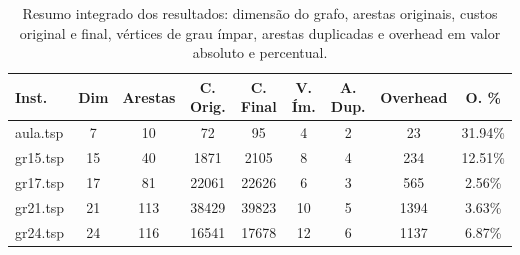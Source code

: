 \begin{table}[H]
    \centering
    \footnotesize
    \begin{tabular}{|l|c|c|c|c|c|c|c|c|}
        \hline
        \textbf{Inst.} & \textbf{Dim} & \textbf{Arestas} & \textbf{C. Orig.} & \textbf{C. Final} & \textbf{V. Ím.} & \textbf{A. Dup.} & \textbf{Overhead} & \textbf{O. \%} \\ \hline
        aula.tsp & 7 & 10 & 72 & 95 & 4 & 2 & 23 & 31.94\% \\ \hline
        gr15.tsp & 15 & 40 & 1871 & 2105 & 8 & 4 & 234 & 12.51\% \\ \hline
        gr17.tsp & 17 & 81 & 22061 & 22626 & 6 & 3 & 565 & 2.56\% \\ \hline
        gr21.tsp & 21 & 113 & 38429 & 39823 & 10 & 5 & 1394 & 3.63\% \\ \hline
        gr24.tsp & 24 & 116 & 16541 & 17678 & 12 & 6 & 1137 & 6.87\% \\ \hline
    \end{tabular}
    \caption{Resumo integrado dos resultados: dimensão do grafo, arestas originais, custos original e final, vértices de grau ímpar, arestas duplicadas e overhead em valor absoluto e percentual.}
    \label{tab:resumo_resultados}
\end{table}
